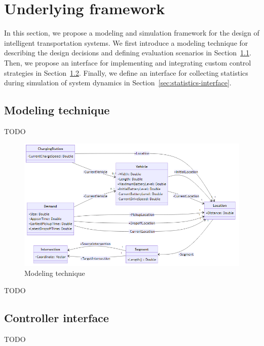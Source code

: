 \documentclass[10pt,twocolumn]{article}
\begin{document}
\section{Underlying framework}
\label{sec:framework}

In this section, we propose a modeling and simulation framework for the design of intelligent transportation systems.
We first introduce a modeling technique for describing the design decisions and defining evaluation scenarios in Section~\ref{sec:modeling-technique}.
Then, we propose an interface for implementing and integrating custom control strategies in Section~\ref{sec:controller-interface}.
Finally, we define an interface for collecting statistics during simulation of system dynamics in Section~\ref{sec:statistics-interface}.

\subsection{Modeling technique}
\label{sec:modeling-technique}

TODO

\begin{figure}[tbp]
    \includegraphics[width=\textwidth]{../../diagrams/model/classes-v0.1.png}
    \caption{Modeling technique}
    \label{fig:modeling-technique}
\end{figure}

TODO

\subsection{Controller interface}
\label{sec:controller-interface}

TODO
\end{document}
